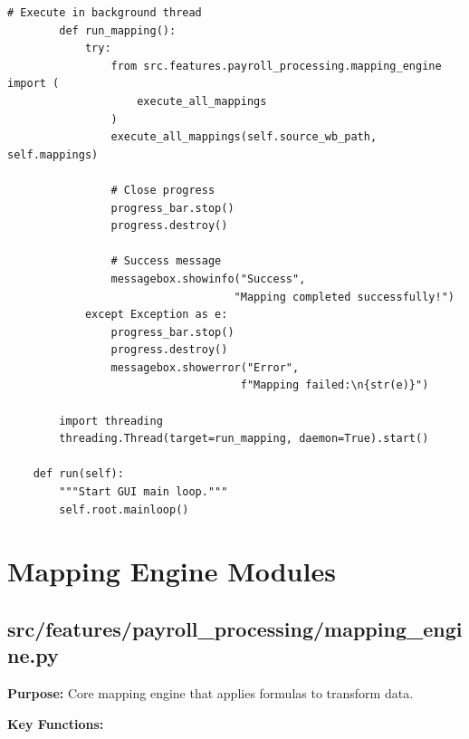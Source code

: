 \begin{lstlisting}[style=pythonstyle]
        # Execute in background thread
        def run_mapping():
            try:
                from src.features.payroll_processing.mapping_engine import (
                    execute_all_mappings
                )
                execute_all_mappings(self.source_wb_path, self.mappings)
                
                # Close progress
                progress_bar.stop()
                progress.destroy()
                
                # Success message
                messagebox.showinfo("Success",
                                   "Mapping completed successfully!")
            except Exception as e:
                progress_bar.stop()
                progress.destroy()
                messagebox.showerror("Error",
                                    f"Mapping failed:\n{str(e)}")
        
        import threading
        threading.Thread(target=run_mapping, daemon=True).start()
    
    def run(self):
        """Start GUI main loop."""
        self.root.mainloop()
\end{lstlisting}

\section{Mapping Engine Modules}

\subsection{src/features/payroll\_processing/mapping\_engine.py}

\textbf{Purpose:} Core mapping engine that applies formulas to transform data.

\textbf{Key Functions:}

